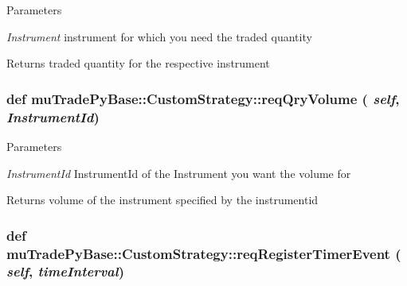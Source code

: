 \begin{DoxyParams}{Parameters}
\item[{\em Instrument}]instrument for which you need the traded quantity \end{DoxyParams}
\begin{DoxyReturn}{Returns}
traded quantity for the respective instrument 
\end{DoxyReturn}
\hypertarget{classmuTradePyBase_1_1CustomStrategy_a45942a08cd5fd7cd63ca6873786e2249}{
\subsubsection[{reqQryVolume}]{\setlength{\rightskip}{0pt plus 5cm}def muTradePyBase::CustomStrategy::reqQryVolume ( {\em self}, \/   {\em InstrumentId})}}
\label{classmuTradePyBase_1_1CustomStrategy_a45942a08cd5fd7cd63ca6873786e2249}

\begin{DoxyParams}{Parameters}
\item[{\em InstrumentId}]InstrumentId of the Instrument you want the volume for \end{DoxyParams}
\begin{DoxyReturn}{Returns}
volume of the instrument specified by the instrumentid 
\end{DoxyReturn}
\hypertarget{classmuTradePyBase_1_1CustomStrategy_a45cf7b8c54ce0ac8a226c3006ae20901}{
\subsubsection[{reqRegisterTimerEvent}]{\setlength{\rightskip}{0pt plus 5cm}def muTradePyBase::CustomStrategy::reqRegisterTimerEvent ( {\em self}, \/   {\em timeInterval})}}
\label{classmuTradePyBase_1_1CustomStrategy_a45cf7b8c54ce0ac8a226c3006ae20901}



